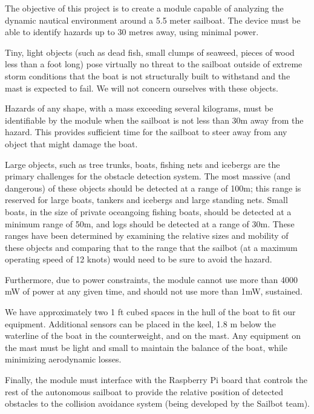 The objective of this project is to create a module capable of analyzing the dynamic nautical environment around a 5.5 meter sailboat. The device must be able to identify hazards up to 30 metres away, using minimal power.

Tiny, light objects (such as dead fish, small clumps of seaweed, pieces of wood less than a foot long) pose virtually no threat to the sailboat outside of extreme storm conditions that the boat is not structurally built to withstand and the mast is expected to fail. We will not concern ourselves with these objects.

Hazards of any shape, with a mass exceeding several kilograms, must be identifiable by the module when the sailboat is not less than 30m away from the hazard. This provides sufficient time for the sailboat to steer away from any object that might damage the boat.

Large objects, such as tree trunks, boats, fishing nets and icebergs are the primary challenges for the obstacle detection system. The most massive (and dangerous) of these objects should be detected at a range of 100m; this range is reserved for large boats, tankers and icebergs and large standing nets. Small boats, in the size of private oceangoing fishing boats, should be detected at a minimum range of 50m, and logs should be detected at a range of 30m. These ranges have been determined by examining the relative sizes and mobility of these objects and comparing that to the range that the sailbot (at a maximum operating speed of 12 knots) would need to be sure to avoid the hazard.

Furthermore, due to power constraints, the module cannot use more than 4000 mW of power at any given time, and should not use more than 1mW, sustained.

We have approximately two 1 ft cubed spaces in the hull of the boat to fit our equipment. Additional sensors can be placed in the keel, 1.8 m below the waterline of the boat in the counterweight, and on the mast. Any equipment on the mast must be light and small to maintain the balance of the boat, while minimizing aerodynamic losses.

Finally, the module must interface with the Raspberry Pi board that controls the rest of the autonomous sailboat to provide the relative position of detected obstacles to the collision avoidance system (being developed by the Sailbot team).